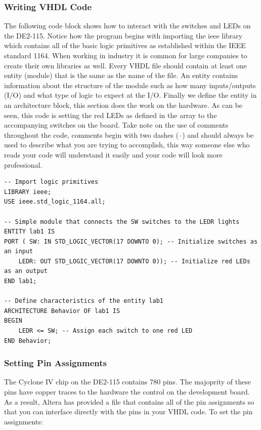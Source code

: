 \subsubsection{Writing VHDL Code}

The following code block shows how to interact with the switches and LEDs on the DE2-115. Notice how the program begins with importing the ieee library which contains all of the basic logic primitives as established within the IEEE standard 1164. When working in industry it is common for large companies to create their own libraries as well. Every VHDL file should contain at least one entity (module) that is the same as the name of the file. An entity contains information about the structure of the module such as how many inputs/outputs (I/O) and what type of logic to expect at the I/O. Finally we define the entity in an architecture block, this section does the work on the hardware. As can be seen, this code is setting the red LEDs as defined in the array to the accompanying switches on the board. Take note on the use of comments throughout the code, comments begin with two dashes (--) and should always be used to describe what you are trying to accomplish, this way someone else who reads your code will understand it easily and your code will look more professional. 

\begin{lstlisting}
-- Import logic primitives
LIBRARY ieee;
USE ieee.std_logic_1164.all;

-- Simple module that connects the SW switches to the LEDR lights
ENTITY lab1 IS
PORT ( SW: IN STD_LOGIC_VECTOR(17 DOWNTO 0); -- Initialize switches as an input
	LEDR: OUT STD_LOGIC_VECTOR(17 DOWNTO 0)); -- Initialize red LEDs as an output
END lab1;

-- Define characteristics of the entity lab1
ARCHITECTURE Behavior OF lab1 IS
BEGIN
	LEDR <= SW; -- Assign each switch to one red LED
END Behavior;
\end{lstlisting}

\subsubsection{Setting Pin Assignments}
The Cyclone IV chip on the DE2-115 contains 780 pins. The majoprity of these pins have copper traces to the hardware the control on the development board. As a result, Altera has provided a file that contains all of the pin assignments so that you can interface directly with the pins in your VHDL code. To set the pin assignments:

